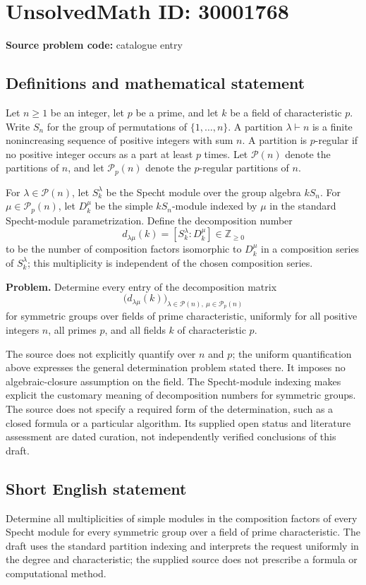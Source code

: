 \documentclass[11pt]{article}
\newcommand{\Z}{\mathbb{Z}}
\begin{document}
\section*{UnsolvedMath ID: 30001768}
\textbf{Source problem code:} catalogue entry
\subsection{Definitions and mathematical statement}
Let \(n\geq 1\) be an integer, let \(p\) be a prime, and let \(k\) be a field of characteristic \(p\). Write \(S_n\) for the group of permutations of \(\{1,\ldots,n\}\). A partition \(\lambda\vdash n\) is a finite nonincreasing sequence of positive integers with sum \(n\). A partition is \(p\)-regular if no positive integer occurs as a part at least \(p\) times. Let \(\mathcal P(n)\) denote the partitions of \(n\), and let \(\mathcal P_p(n)\) denote the \(p\)-regular partitions of \(n\).

For \(\lambda\in\mathcal P(n)\), let \(S_k^\lambda\) be the Specht module over the group algebra \(kS_n\). For \(\mu\in\mathcal P_p(n)\), let \(D_k^\mu\) be the simple \(kS_n\)-module indexed by \(\mu\) in the standard Specht-module parametrization. Define the decomposition number
\[
 d_{\lambda\mu}(k)=[S_k^\lambda:D_k^\mu]\in\Z_{\geq 0}
\]
to be the number of composition factors isomorphic to \(D_k^\mu\) in a composition series of \(S_k^\lambda\); this multiplicity is independent of the chosen composition series.

\textbf{Problem.} Determine every entry of the decomposition matrix
\[
 \bigl(d_{\lambda\mu}(k)\bigr)_{\lambda\in\mathcal P(n),\ \mu\in\mathcal P_p(n)}
\]
for symmetric groups over fields of prime characteristic, uniformly for all positive integers \(n\), all primes \(p\), and all fields \(k\) of characteristic \(p\).

The source does not explicitly quantify over \(n\) and \(p\); the uniform quantification above expresses the general determination problem stated there. It imposes no algebraic-closure assumption on the field. The Specht-module indexing makes explicit the customary meaning of decomposition numbers for symmetric groups. The source does not specify a required form of the determination, such as a closed formula or a particular algorithm. Its supplied open status and literature assessment are dated curation, not independently verified conclusions of this draft.
\subsection{Short English statement}
Determine all multiplicities of simple modules in the composition factors of every Specht module for every symmetric group over a field of prime characteristic. The draft uses the standard partition indexing and interprets the request uniformly in the degree and characteristic; the supplied source does not prescribe a formula or computational method.
\end{document}
